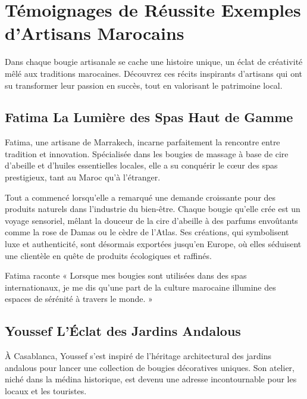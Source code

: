 \documentclass[11pt,fleqn,onecolumn,oneside]{book}
\begin{document}
\section{Témoignages de Réussite Exemples d’Artisans Marocains}

\begin{definition}
Dans chaque bougie artisanale se cache une histoire unique, un éclat de créativité mêlé aux traditions marocaines. Découvrez ces récits inspirants d’artisans qui ont su transformer leur passion en succès, tout en valorisant le patrimoine local.
\end{definition}

\subsection*{Fatima La Lumière des Spas Haut de Gamme}

\begin{remark}
Fatima, une artisane de Marrakech, incarne parfaitement la rencontre entre tradition et innovation. Spécialisée dans les bougies de massage à base de cire d’abeille et d’huiles essentielles locales, elle a su conquérir le cœur des spas prestigieux, tant au Maroc qu’à l’étranger.
\end{remark}

Tout a commencé lorsqu’elle a remarqué une demande croissante pour des produits naturels dans l’industrie du bien-être. Chaque bougie qu’elle crée est un voyage sensoriel, mêlant la douceur de la cire d’abeille à des parfums envoûtants comme la rose de Damas ou le cèdre de l’Atlas. Ses créations, qui symbolisent luxe et authenticité, sont désormais exportées jusqu’en Europe, où elles séduisent une clientèle en quête de produits écologiques et raffinés.

\begin{example}
Fatima raconte « Lorsque mes bougies sont utilisées dans des spas internationaux, je me dis qu’une part de la culture marocaine illumine des espaces de sérénité à travers le monde. »
\end{example}

\subsection*{Youssef L’Éclat des Jardins Andalous}

\begin{corollary}
À Casablanca, Youssef s’est inspiré de l’héritage architectural des jardins andalous pour lancer une collection de bougies décoratives uniques. Son atelier, niché dans la médina historique, est devenu une adresse incontournable pour les locaux et les touristes.
\end{corollary}
\end{document}
